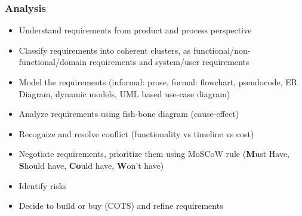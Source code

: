 \documentclass{article}
\begin{document}
\subsubsection{Analysis}
\begin{itemize}
    \item Understand requirements from product and process perspective
    
    \item Classify requirements into coherent clusters, as functional/non-functional/domain requirements and system/user requirements
    
    \item Model the requirements (informal: prose, formal: flowchart, pseudocode, ER Diagram, dynamic models, UML based use-case diagram)
    
    \item Analyze requirements using fish-bone diagram (cause-effect)
    
    \item Recognize and resolve conflict (functionality vs timeline vs cost)
    
    \item Negotiate requirements, prioritize them using MoSCoW rule (\textbf{M}ust Have, \textbf{S}hould have, \textbf{Co}uld have, \textbf{W}on't have)
    
    \item Identify risks
    
    \item Decide to build or buy (COTS) and refine requirements
\end{itemize}
\end{document}
